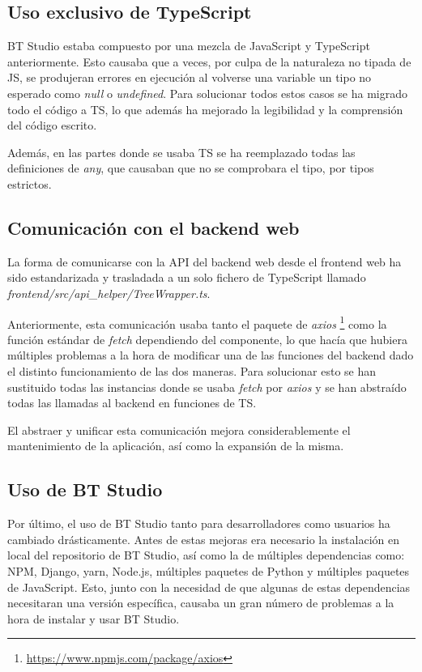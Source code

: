 \subsection{Uso exclusivo de TypeScript}

BT Studio estaba compuesto por una mezcla de JavaScript y TypeScript anteriormente. Esto causaba que a veces, por culpa de la naturaleza no tipada de JS, se produjeran errores en ejecución al volverse una variable un tipo no esperado como \textit{null} o \textit{undefined}. Para solucionar todos estos casos se ha migrado todo el código a TS, lo que además ha mejorado la legibilidad y la comprensión del código escrito.

Además, en las partes donde se usaba TS se ha reemplazado todas las definiciones de \textit{any}, que causaban que no se comprobara el tipo, por tipos estrictos.

\subsection{Comunicación con el backend web}

La forma de comunicarse con la API del backend web desde el frontend web ha sido estandarizada y trasladada a un solo fichero de TypeScript llamado \textit{frontend/src/api\_helper/TreeWrapper.ts}.

Anteriormente, esta comunicación usaba tanto el paquete de \textit{axios} \footnote{\url{https://www.npmjs.com/package/axios}} como la función estándar de \textit{fetch} dependiendo del componente, lo que hacía que hubiera múltiples problemas a la hora de modificar una de las funciones del backend dado el distinto funcionamiento de las dos maneras. Para solucionar esto se han sustituido todas las instancias donde se usaba \textit{fetch} por \textit{axios} y se han abstraído todas las llamadas al backend en funciones de TS.

El abstraer y unificar esta comunicación mejora considerablemente el mantenimiento de la aplicación, así como la expansión de la misma.

\subsection{Uso de BT Studio}\label{sec:uso-bt}

Por último, el uso de BT Studio tanto para desarrolladores como usuarios ha cambiado drásticamente. Antes de estas mejoras era necesario la instalación en local del repositorio de BT Studio, así como la de múltiples dependencias como: NPM, Django, yarn, Node.js, múltiples paquetes de Python y múltiples paquetes de JavaScript. Esto, junto con la necesidad de que algunas de estas dependencias necesitaran una versión específica, causaba un gran número de problemas a la hora de instalar y usar BT Studio.

